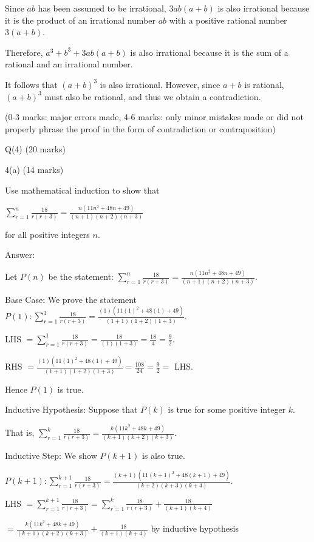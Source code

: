 \documentclass[a4paper,12pt,oneside]{book}
\theoremstyle{definition}
\begin{document}
Since $ab$ has been assumed to be irrational, $3ab(a+b)$ is also irrational because it is the product of an irrational number $ab$ with a positive rational number $3(a+b)$. 

Therefore,  $a^3 + b^3 + 3ab(a+b)$ is also irrational because it is the sum of a rational and an irrational number. 

It follows that $(a+b)^3$ is also irrational. However, since $a+b$ is rational, $(a+b)^3$ must also be rational, and thus we obtain a contradiction.

(0-3 marks: major errors made, 4-6 marks: only minor mistakes made or did not properly phrase the proof in the form of contradiction or contraposition)

\newpage

Q(4) (20 marks)

4(a) (14 marks)

Use mathematical induction to show that

$\sum_{r=1}^n \frac{18}{r(r+3)} = \frac{n(11n^2 + 48n + 49)}{(n+1)(n+2)(n+3)}$

for all positive integers $n$.

Answer:

Let $P(n)$ be the statement: $\sum_{r=1}^n \frac{18}{r(r+3)} = \frac{n(11n^2 + 48n + 49)}{(n+1)(n+2)(n+3)}$.

Base Case: We prove the statement $P(1) : \sum_{r=1}^1 \frac{18}{r(r+3)} = \frac{(1)(11(1)^2 + 48(1) + 49)}{(1+1)(1+2)(1+3)}$.

LHS $ = \sum_{r=1}^1 \frac{18}{r(r+3)} = \frac{18}{(1)(1+3)} = \frac{18}{4} = \frac{9}{2}$.

RHS $ = \frac{(1)(11(1)^2 + 48(1) + 49)}{(1+1)(1+2)(1+3)} = \frac{108}{24} = \frac{9}{2} = $ LHS.

Hence $P(1)$ is true.

Inductive Hypothesis: Suppose that $P(k)$ is true for some positive integer $k$.

That is, $\sum_{r=1}^k \frac{18}{r(r+3)} = \frac{k(11k^2 + 48k + 49)}{(k+1)(k+2)(k+3)}$.

Inductive Step: We show $P(k+1)$  is also true.

$P(k+1) : \sum_{r=1}^{k+1} \frac{18}{r(r+3)} = \frac{(k+1)(11(k+1)^2 + 48(k+1) + 49)}{(k+2)(k+3)(k+4)}$.

LHS $ = \sum_{r=1}^{k+1} \frac{18}{r(r+3)}  = \sum_{r=1}^{k} \frac{18}{r(r+3)} + \frac{18}{(k+1)(k+4)}$

$=  \frac{k(11k^2 + 48k + 49)}{(k+1)(k+2)(k+3)} + \frac{18}{(k+1)(k+4)}$ by inductive hypothesis
\end{document}
